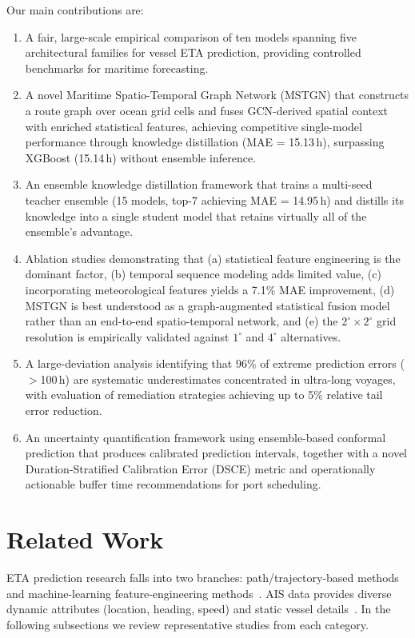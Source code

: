 \documentclass[sigconf,anonymous]{acmart}%
\begin{document}
Our main contributions are:
\begin{enumerate}
    \item A fair, large-scale empirical comparison of ten models spanning five architectural families for vessel ETA prediction, providing controlled benchmarks for maritime forecasting.
    \item A novel Maritime Spatio-Temporal Graph Network (MSTGN) that constructs a route graph over ocean grid cells and fuses GCN-derived spatial context with enriched statistical features, achieving competitive single-model performance through knowledge distillation (MAE = 15.13\,h), surpassing XGBoost (15.14\,h) without ensemble inference.
    \item An ensemble knowledge distillation framework that trains a multi-seed teacher ensemble (15 models, top-7 achieving MAE = 14.95\,h) and distills its knowledge into a single student model that retains virtually all of the ensemble's advantage.
    \item Ablation studies demonstrating that (a) statistical feature engineering is the dominant factor, (b) temporal sequence modeling adds limited value, (c) incorporating meteorological features yields a 7.1\% MAE improvement, (d) MSTGN is best understood as a graph-augmented statistical fusion model rather than an end-to-end spatio-temporal network, and (e) the $2^\circ{\times}2^\circ$ grid resolution is empirically validated against $1^\circ$ and $4^\circ$ alternatives.
    \item A large-deviation analysis identifying that 96\% of extreme prediction errors ($>$100\,h) are systematic underestimates concentrated in ultra-long voyages, with evaluation of remediation strategies achieving up to 5\% relative tail error reduction.
    \item An uncertainty quantification framework using ensemble-based conformal prediction that produces calibrated prediction intervals, together with a novel Duration-Stratified Calibration Error (DSCE) metric and operationally actionable buffer time recommendations for port scheduling.
\end{enumerate}

\section{Related Work}
ETA prediction research falls into two branches: path/trajectory-based methods and machine-learning feature-engineering methods~\cite{leiPredictingVesselArrival2024}. AIS data provides diverse dynamic attributes (location, heading, speed) and static vessel details~\cite{yangHarnessingPowerMachine2024}. In the following subsections we review representative studies from each category.
\end{document}
